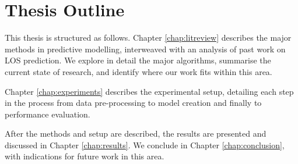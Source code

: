 \section{Thesis Outline}
This thesis is structured as follows. Chapter \ref{chap:litreview} describes
the major methods in predictive modelling, interweaved with an analysis of
past work on LOS prediction. We explore in detail the major algorithms,
summarise the current state of research, and identify where our work fits
within this area.

Chapter \ref{chap:experiments} describes the experimental setup, detailing
each step in the process from data pre-processing to model creation and
finally to performance evaluation.

After the methods and setup are described, the results are presented and
discussed in Chapter \ref{chap:results}. We conclude in Chapter
\ref{chap:conclusion}, with indications for future work in this area.
